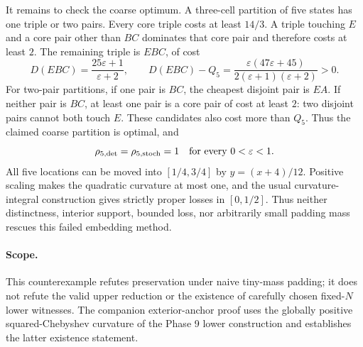 It remains to check the coarse optimum.  A three-cell partition of five
states has one triple or two pairs.  Every core triple costs at least
$14/3$.  A triple touching $E$ and a core pair other than $BC$ dominates
that core pair and therefore costs at least $2$.  The remaining triple is
$EBC$, of cost
\[
 D(EBC)=\frac{25\varepsilon+1}{\varepsilon+2},\qquad
 D(EBC)-Q_5
 =\frac{\varepsilon(47\varepsilon+45)}
 {2(\varepsilon+1)(\varepsilon+2)}>0.
\]
For two-pair partitions, if one pair is $BC$, the cheapest disjoint pair
is $EA$.  If neither pair is $BC$, at least one pair is a core pair of cost
at least $2$: two disjoint pairs cannot both touch $E$.  These candidates
also cost more than $Q_5$.  Thus the claimed coarse partition is optimal,
and
\[
 \rho_{5,\mathrm{det}}=\rho_{5,\mathrm{stoch}}=1
 \quad\hbox{for every }0<\varepsilon<1.
\]
All five locations can be moved into $[1/4,3/4]$ by
$y=(x+4)/12$.  Positive scaling makes the quadratic curvature at most one,
and the usual curvature-integral construction gives strictly proper losses
in $[0,1/2]$.  Thus neither distinctness, interior support, bounded loss,
nor arbitrarily small padding mass rescues this failed embedding method.

\paragraph{Scope.}
This counterexample refutes preservation under naive tiny-mass padding; it
does not refute the valid upper reduction or the existence of carefully
chosen fixed-$N$ lower witnesses.  The companion exterior-anchor proof
uses the globally positive squared-Chebyshev curvature of the Phase 9
lower construction and establishes the latter existence statement.

